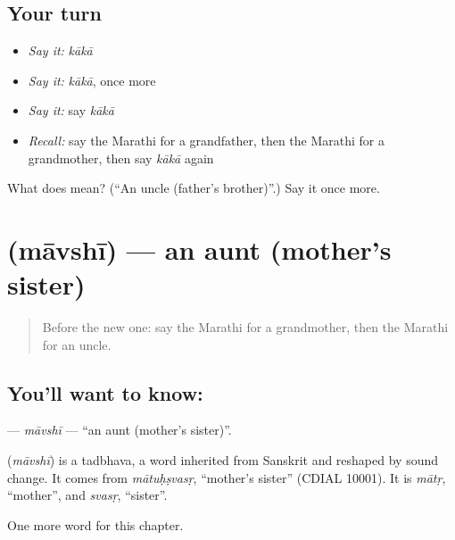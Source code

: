 \subsection*{Your turn}
\begin{itemize}
\raggedright
  \item \emph{Say it:} \emph{kākā}
  \item \emph{Say it:} \emph{kākā}, once more
  \item \emph{Say it:} say \emph{kākā}
  \item \emph{Recall:} say the Marathi for a grandfather, then the Marathi for a grandmother, then say \emph{kākā} again
\end{itemize}

\begin{tcolorbox}[breakable,colback=teal!4,colframe=teal!35!black,title={Before you move on}]
What does  mean? (\textquotedblleft{}An uncle (father's brother)\textquotedblright{}.) Say it once more.
\end{tcolorbox}
\section[\texorpdfstring{\mr{मावशी} (māvshī)}{मावशी (māvshī)}]{ (māvshī) — an aunt (mother's sister)}

\label{lesson:MR-C75-mavshi}



\begin{quote}
Before the new one: say the Marathi for a grandmother, then the Marathi for an uncle.
\end{quote}

\subsection*{You'll want to know: }
\textbf{} — \emph{māvshī} — \textquotedblleft{}an aunt (mother's sister)\textquotedblright{}.

\begin{cousinweb}
\textbf{} (\emph{māvshī}) is a tadbhava, a word inherited from Sanskrit and reshaped by sound change. It comes from \emph{mātuḥṣvasṛ}, \textquotedblleft{}mother's sister\textquotedblright{} (CDIAL 10001). It is \emph{mātṛ}, \textquotedblleft{}mother\textquotedblright{}, and \emph{svasṛ}, \textquotedblleft{}sister\textquotedblright{}.
\end{cousinweb}

\begin{grammarlens}[title={What you've built}]
One more word for this chapter.
\end{grammarlens}

